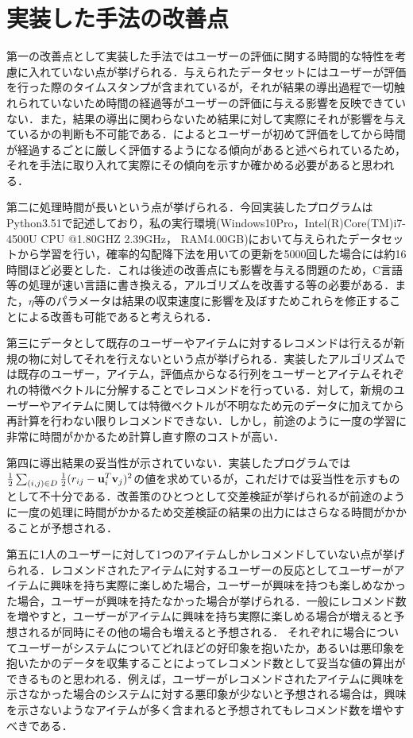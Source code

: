 \documentclass[a4j,titlepage]{jarticle}
\begin{document}
\section{実装した手法の改善点}
第一の改善点として実装した手法ではユーザーの評価に関する時間的な特性を考慮に入れていない点が挙げられる．与えられたデータセットにはユーザーが評価を行った際のタイムスタンプが含まれているが，それが結果の導出過程で一切触れられていないため時間の経過等がユーザーの評価に与える影響を反映できていない．また，結果の導出に関わらないため結果に対して実際にそれが影響を与えているかの判断も不可能である．\cite{a}によるとユーザーが初めて評価をしてから時間が経過するごとに厳しく評価するようになる傾向があると述べられているため，それを手法に取り入れて実際にその傾向を示すか確かめる必要があると思われる．

第二に処理時間が長いという点が挙げられる．今回実装したプログラムはPython3.51で記述しており，私の実行環境(Windows10Pro，Intel(R)Core(TM)i7-4500U CPU @1.80GHZ 2.39GHz， RAM4.00GB)において与えられたデータセットから学習を行い，確率的勾配降下法を用いての更新を5000回した場合には約16時間ほど必要とした．これは後述の改善点にも影響を与える問題のため，C言語等の処理が速い言語に書き換える，アルゴリズムを改善する等の必要がある．また，$\eta$等のパラメータは結果の収束速度に影響を及ぼすためこれらを修正することによる改善も可能であると考えられる．

第三にデータとして既存のユーザーやアイテムに対するレコメンドは行えるが新規の物に対してそれを行えないという点が挙げられる．実装したアルゴリズムでは既存のユーザー，アイテム，評価点からなる行列をユーザーとアイテムそれぞれの特徴ベクトルに分解することでレコメンドを行っている．対して，新規のユーザーやアイテムに関しては特徴ベクトルが不明なため元のデータに加えてから再計算を行わない限りレコメンドできない．しかし，前途のように一度の学習に非常に時間がかかるため計算し直す際のコストが高い．

第四に導出結果の妥当性が示されていない．実装したプログラムでは$\frac{1}{2}\sum_{(i,j) \in D}\frac{1}{2}(r_{ij}-{\bf u}_{i}^T{\bf v}_{j})^2$の値を求めているが，これだけでは妥当性を示すものとして不十分である．改善策のひとつとして交差検証が挙げられるが前途のように一度の処理に時間がかかるため交差検証の結果の出力にはさらなる時間がかかることが予想される．

第五に1人のユーザーに対して1つのアイテムしかレコメンドしていない点が挙げられる．レコメンドされたアイテムに対するユーザーの反応としてユーザーがアイテムに興味を持ち実際に楽しめた場合，ユーザーが興味を持つも楽しめなかった場合，ユーザーが興味を持たなかった場合が挙げられる．一般にレコメンド数を増やすと，ユーザーがアイテムに興味を持ち実際に楽しめる場合が増えると予想されるが同時にその他の場合も増えると予想される．
それぞれに場合についてユーザーがシステムについてどれほどの好印象を抱いたか，あるいは悪印象を抱いたかのデータを収集することによってレコメンド数として妥当な値の算出ができるものと思われる．例えば，ユーザーがレコメンドされたアイテムに興味を示さなかった場合のシステムに対する悪印象が少ないと予想される場合は，興味を示さないようなアイテムが多く含まれると予想されてもレコメンド数を増やすべきである．
\end{document}
